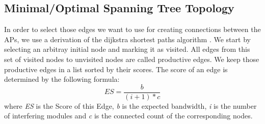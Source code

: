   \subsection{Minimal/Optimal Spanning Tree Topology}
  In order to select those edges we want to use for creating connections between the APs, we use a derivation of the dijkstra shortest paths algorithm \cite{dijkstra1959note}.
  We start by selecting an arbitray initial node and marking it as visited. All edges from this set of visited nodes to unvisited nodes are called productive edges.
  We keep those productive edges in a list sorted by their scores. The score of an edge is determined by the following formula:
  \begin{equation} \label{eq:edgescore}
    ES=\frac{b}{(i + 1 )* c}
  \end{equation}
  where \textit{ES} is the Score of this Edge, \textit{b} is the expected bandwidth, \textit{i} is the number of interfering modules and \textit{c} is the connected count of the corresponding nodes.
